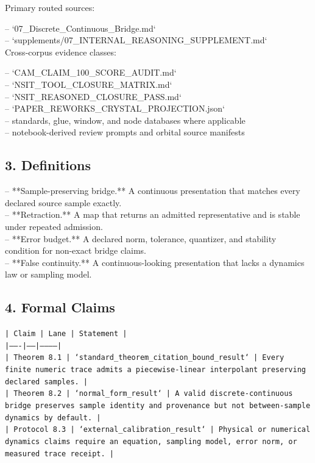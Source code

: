 \documentclass[11pt]{article}
\begin{document}
Primary routed sources:

\noindent{}-- `07\_Discrete\_Continuous\_Bridge.md`\\
\noindent{}-- `supplements/07\_INTERNAL\_REASONING\_SUPPLEMENT.md`\\

Cross-corpus evidence classes:

\noindent{}-- `CAM\_CLAIM\_100\_SCORE\_AUDIT.md`\\
\noindent{}-- `NSIT\_TOOL\_CLOSURE\_MATRIX.md`\\
\noindent{}-- `NSIT\_REASONED\_CLOSURE\_PASS.md`\\
\noindent{}-- `PAPER\_REWORKS\_CRYSTAL\_PROJECTION.json`\\
\noindent{}-- standards, glue, window, and node databases where applicable\\
\noindent{}-- notebook-derived review prompts and orbital source manifests\\

\subsection*{3. Definitions}

\noindent{}-- **Sample-preserving bridge.** A continuous presentation that matches every declared source sample exactly.\\
\noindent{}-- **Retraction.** A map that returns an admitted representative and is stable under repeated admission.\\
\noindent{}-- **Error budget.** A declared norm, tolerance, quantizer, and stability condition for non-exact bridge claims.\\
\noindent{}-- **False continuity.** A continuous-looking presentation that lacks a dynamics law or sampling model.\\

\subsection*{4. Formal Claims}

\noindent\texttt{| Claim | Lane | Statement |}\\
\noindent\texttt{|-------|------|-----------|}\\
\noindent\texttt{| Theorem 8.1 | `standard\_theorem\_citation\_bound\_result` | Every finite numeric trace admits a piecewise-linear interpolant preserving declared samples. |}\\
\noindent\texttt{| Theorem 8.2 | `normal\_form\_result` | A valid discrete-continuous bridge preserves sample identity and provenance but not between-sample dynamics by default. |}\\
\noindent\texttt{| Protocol 8.3 | `external\_calibration\_result` | Physical or numerical dynamics claims require an equation, sampling model, error norm, or measured trace receipt. |}\\
\end{document}
